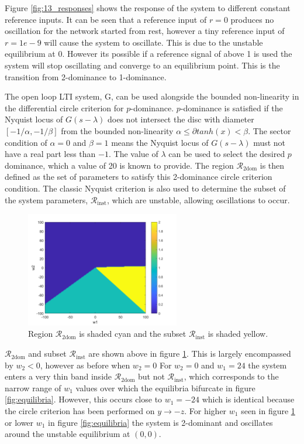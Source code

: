 \documentclass{article}
\begin{document}
Figure \ref{fig:13_responses} shows the response of the system to different constant reference inputs.
It can be seen that a reference input of $r = 0$ produces no oscillation for the network started from rest, however a tiny reference input of $r=1e-9$ will cause the system to oscillate.
This is due to the unstable equilibrium at 0.
However its possible if a reference signal of above 1 is used the system will stop oscillating and converge to an equilibrium point.
This is the transition from 2-dominance to 1-dominance.

The open loop LTI system, G, can be used alongside the bounded non-linearity in the differential circle criterion for $p$-dominance.
$p$-dominance is satisfied if the Nyquist locus of $G(s-\lambda)$ does not intersect the disc with diameter $[-1/\alpha, -1/\beta]$ from the bounded non-linearity $\alpha \leq \partial tanh(x) < \beta$.
The sector condition of $\alpha=0$ and $\beta=1$ means the Nyquist locus of $G(s-\lambda)$ must not have a real part less than $-1$.
The value of $\lambda$ can be used to select the desired $p$ dominance, which a value of 20 is known to provide.
The region $\mathcal{R}_\text{2dom}$ is then defined as the set of parameters to satisfy this 2-dominance circle criterion condition.
The classic Nyquist criterion is also used to determine the subset of the system parameters, $\mathcal{R}_\text{inst}$, which are unstable, allowing oscillations to occur.

\begin{figure}[H]
    \centering
    \includegraphics[width=0.6\textwidth]{figures/R2dom.png}
    \caption{Region $\mathcal{R}_\text{2dom}$ is shaded cyan and the subset $\mathcal{R}_\text{inst}$ is shaded yellow.}
    \label{fig:R2dom}
\end{figure}

$\mathcal{R}_\text{2dom}$ and subset $\mathcal{R}_\text{inst}$ are shown above in figure \ref{fig:R2dom}.
This is largely encompassed by $w_2 < 0$, however as before when $w_2 = 0$ 
For $w_2 = 0$ and $w_1 = 24$ the system enters a very thin band inside $\mathcal{R}_\text{2dom}$ but not $\mathcal{R}_\text{inst}$,
which corresponds to the narrow range of $w_1$ values over which the equilibria bifurcate in figure \ref{fig:equilibria}.
However, this occurs close to $w_1 = -24$ which is identical because the circle criterion has been performed on $y \to -z$.
For higher $w_1$ seen in figure \ref{fig:R2dom} or lower $w_1$ in figure \ref{fig:equilibria} the system is 2-dominant and oscillates around the unstable equilibrium at $(0,0)$.
\end{document}
